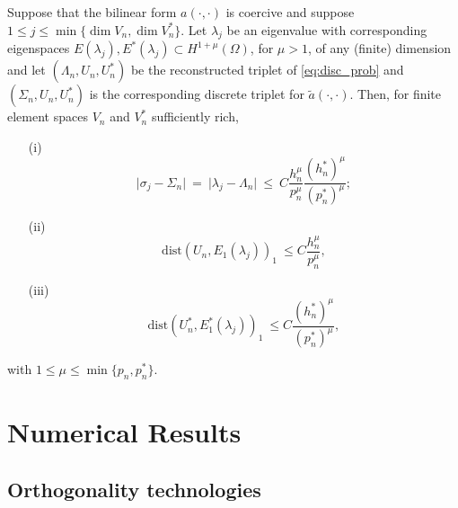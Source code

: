 \documentclass[smallextended]{svjour3}
\begin{document}
\begin{theorem}
\label{th:adj_rec_2}
Suppose  that the bilinear form $a(\cdot,\cdot)$ is coercive and suppose
$ 1 \leq j\leq \min\{\dim V_n,\dim V_n^*\}$. 
Let
$\lambda_j$ be an eigenvalue with
corresponding eigenspaces $E(\lambda_j),E^*(\lambda_j)\subset H^{1+\mu}(\Omega)$, for $\mu>1$, of any (finite) dimension  and
let $(\Lambda_n,U_n,U_n^*)$ be the reconstructed triplet  of \eqref{eq:disc_prob} and $(\Sigma_n,U_n,U_n^*)$ is the corresponding discrete triplet for $\tilde a(\cdot,\cdot)$.
Then, for finite element spaces $V_n$ and $V_n^*$ sufficiently rich,


\begin{itemize}
\item[(i)] 
\begin{equation}\label{eq:supereig_rec_2}
\vert \sigma_j - \Sigma_n \vert \ = \ \vert \lambda_j - \Lambda_n \vert \ \leq \ C
\frac{h_n^{\mu} }{p_n^{\mu}}\frac{(h_n^*)^{\mu} }{(p_n^*)^{\mu}};  
\end{equation}
\item[(ii)] 
\begin{equation}
\label{eq:energy_rec_2} \mathrm{dist}(
U_n,E_1(\lambda_j))_{1} \ \leq
C \frac{h_n^{\mu}}{p_n^{\mu}}, 
\end{equation}
\item[(iii)]
\begin{equation}
\label{eq:energy_dual_rec_2} \mathrm{dist}(
U_n^*,E_1^*(\lambda_j))_{1} \ \leq
C \frac{(h_n^*)^{\mu}}{(p_n^*)^{\mu}}, 
\end{equation}
\end{itemize}
with $1\leq \mu\leq \min\{p_n,p_n^*\}$.
\end{theorem}



\section{Numerical Results} \label{sec:numer}

\subsection{Orthogonality technologies}\label{ssec:ortho}
\end{document}
